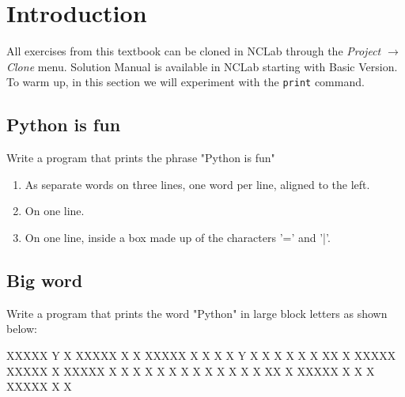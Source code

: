 

\section{Introduction}

All exercises from this textbook can be cloned in NCLab through the {\em Project
$\rightarrow$ Clone} menu. Solution Manual is available in NCLab starting with Basic 
Version. To warm up, in this section we will experiment with the {\tt print} 
command.


\subsection{Python is fun}

Write a program that prints the phrase "Python is fun" 
\begin{enumerate}
\item As separate words on three lines, one word per line, aligned to the left.
\item On one line.
\item On one line, inside a box made up of the characters '=' and '|'.
\end{enumerate}


\subsection{Big word}

Write a program that prints the word "Python" in large block 
letters as shown below:

\begin{bluecode}
XXXXX Y   X XXXXX X   X XXXXX X   X
X   X Y   X   X   X   X X   X XX  X
XXXXX XXXXX   X   XXXXX X   X X X X
X         X   X   X   X X   X X  XX
X     XXXXX   X   X   X XXXXX X   X
\end{bluecode}

